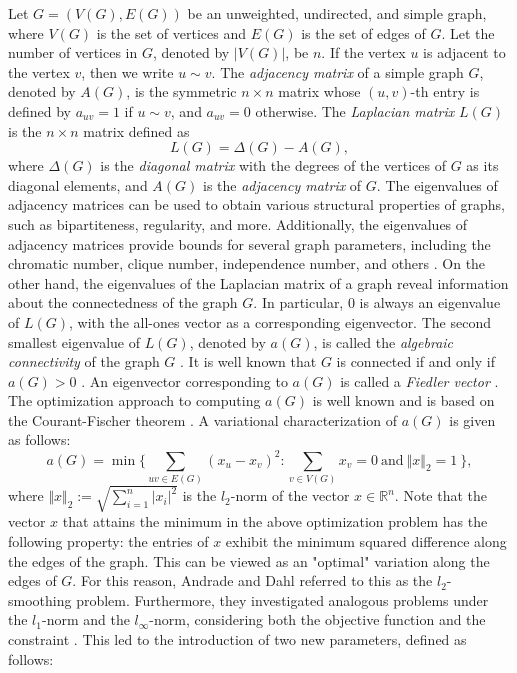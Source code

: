 \documentclass[12pt]{article}
\begin{document}
	
	Let $G = (V(G), E(G))$ be an unweighted, undirected, and simple graph, where $V(G)$ is the set of vertices and $E(G)$ is the set of edges of $G$. Let the number of vertices in $G$, denoted by $\vert V(G) \vert $, be $n$. If the vertex $ u $ is adjacent to the vertex $v$, then we write $ u \sim v $.  The \textit{adjacency matrix} of a simple graph $ G $, denoted by $ A(G) $,  is the symmetric  $ n \times n $  matrix whose  $ (u,v)$-th entry is defined by $ a_{uv}=1 $ if $ u \sim v $, and  $ a_{uv} = 0 $ otherwise. The \textit{Laplacian matrix} $L(G)$ is the $n\times n$  matrix defined as 
	$$
	L(G)=\Delta(G)-A(G),
	$$
	where $\Delta(G)$ is the \textit{diagonal matrix} with the degrees of the vertices of $G$ as its diagonal elements, and $A(G)$ is the \textit{adjacency matrix} of $G$. The eigenvalues of adjacency matrices can be used to obtain various structural properties of graphs, such as bipartiteness, regularity, and more. Additionally, the eigenvalues of adjacency matrices provide bounds for several graph parameters, including the chromatic number, clique number, independence number, and others \cite{graphs-and-matrices, ratio-bound,  nica-book-2018, clique-indep-bound-wilf}.
	On the other hand, the eigenvalues of the Laplacian matrix of a graph reveal information about the connectedness of the graph $G$. In particular, $0$ is always an eigenvalue of $L(G)$, with the all-ones vector as a corresponding eigenvector. The second smallest eigenvalue of $L(G)$, denoted by $a(G)$, is called the \textit{algebraic connectivity} of the graph $G$ \cite{alg-con}. It is well known that $G$ is connected if and only if $a(G) > 0$ \cite{fiedler-1989}.
	An eigenvector corresponding to $a(G)$ is called a \textit{Fiedler vector} \cite{graphs-and-matrices}. The optimization approach to computing $a(G)$ is well known and is based on the Courant-Fischer theorem \cite{matrix-analysis}. A variational characterization of $a(G)$ is given as follows:
	\begin{equation*}
		a(G)=\min  \biggl\{\sum_{uv \in E(G)}(x_u - x_v)^2: \sum_{v \in V(G)} x_v =0 ~\mbox{and}~\Vert x \Vert _{2}=1\ \biggl\},
	\end{equation*} 
	where $\Vert x \Vert_2 := \sqrt{\sum\limits_{i=1}^n \vert x_i \vert^2}$ is the $l_2$-norm of the vector $x\in \mathbb{R}^n$. Note that the vector $x$ that attains the minimum in the above optimization problem has the following property: the entries of $x$ exhibit the minimum squared difference along the edges of the graph. This can be viewed as an "optimal" variation along the edges of $G$. For this reason, Andrade and Dahl \cite{enide-geir-2024} referred to this as the $l_2$-smoothing problem. Furthermore, they investigated analogous problems under the $l_1$-norm and the $l_\infty$-norm, considering both the objective function and the constraint \cite{enide-geir-2024}. This led to the introduction of two new parameters, defined as follows:
\end{document}
